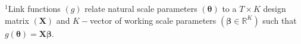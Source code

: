 \documentclass[12pt]{article}\usepackage[]{graphicx}\usepackage[]{xcolor}
\begin{document}
\begin{small}
\begin{table}
\begin{tabular}{llll}
  \bottomrule
  \end{tabular}
  \footnotesize{$^1$Link functions $(g)$ relate natural scale parameters $({\boldsymbol \theta})$ to a $T \times K$ design matrix $({\mathbf X})$ and $K-$vector of working scale parameters $(\boldsymbol{\beta}\in \mathbb{R}^K)$ such that $g({\boldsymbol \theta})={\mathbf X}\boldsymbol{\beta}$. %
}
\end{table}
\end{small}


\end{document}
